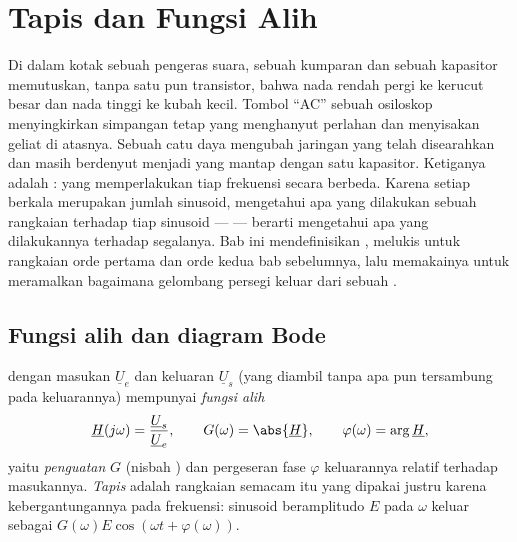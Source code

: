 \chapter{Tapis dan Fungsi Alih}\label{ch:b1:filters-transfer-functions}

Di dalam kotak sebuah pengeras suara, sebuah kumparan dan sebuah
kapasitor memutuskan, tanpa satu pun transistor, bahwa nada rendah pergi
ke kerucut besar dan nada tinggi ke kubah kecil. Tombol ``AC'' sebuah
osiloskop menyingkirkan simpangan tetap yang menghanyut perlahan dan
menyisakan geliat di atasnya. Sebuah catu daya mengubah 
jaringan yang telah disearahkan dan masih berdenyut menjadi 
yang mantap dengan satu kapasitor. Ketiganya adalah \emph{}:
 yang memperlakukan tiap frekuensi secara berbeda.
Karena setiap  berkala merupakan jumlah sinusoid, mengetahui apa
yang dilakukan sebuah rangkaian terhadap tiap sinusoid ---  --- berarti mengetahui apa yang dilakukannya terhadap segalanya.
Bab ini mendefinisikan , melukis  untuk
rangkaian orde pertama dan orde kedua bab sebelumnya, lalu memakainya
untuk meramalkan bagaimana gelombang persegi keluar dari sebuah .

\section{Fungsi alih dan diagram Bode}

\begin{definition}\label{def:b1:filters-transfer-functions:H}
 dengan  masukan $\underline U_e$ dan 
keluaran $\underline U_s$ (yang diambil tanpa apa pun tersambung pada
keluarannya) mempunyai \emph{fungsi alih}
\[
\underline H(j\omega) = \frac{\underline U_s}{\underline U_e},
\qquad G(\omega) = \abs{\underline H}, \qquad \varphi(\omega) = \arg\underline H,
\]
yaitu \emph{penguatan} $G$ (nisbah ) dan pergeseran fase
$\varphi$ keluarannya relatif terhadap masukannya. \emph{Tapis} adalah
rangkaian semacam itu yang dipakai justru karena kebergantungannya pada
frekuensi: sinusoid beramplitudo $E$ pada $\omega$ keluar sebagai
$G(\omega)E\cos(\omega t + \varphi(\omega))$.
\end{definition}

